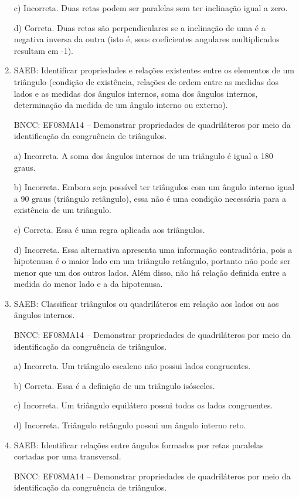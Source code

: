 \begin{enumerate}
c) Incorreta. Duas retas podem ser paralelas sem ter inclinação
igual a zero.

d) Correta. Duas retas são perpendiculares se a inclinação de uma é a
negativa inversa da outra (isto é, seus coeficientes angulares
multiplicados resultam em -1).

\item SAEB: Identificar propriedades e relações existentes entre os elementos
de um triângulo (condição de existência, relações de ordem entre as
medidas dos lados e as medidas dos ângulos internos, soma dos ângulos
internos, determinação da medida de um ângulo interno ou externo).

BNCC: EF08MA14 -- Demonstrar propriedades de quadriláteros por meio da
identificação da congruência de triângulos.

a) Incorreta. A soma dos ângulos internos de um triângulo é igual a
180 graus.

b) Incorreta. Embora seja possível ter triângulos com um ângulo
interno igual a 90 graus (triângulo retângulo), essa não é uma condição
necessária para a existência de um triângulo.

c) Correta. Essa é uma regra aplicada aos triângulos.

d) Incorreta. Essa alternativa apresenta uma informação
contraditória, pois a hipotenusa é o maior lado em um triângulo
retângulo, portanto não pode ser menor que um dos outros lados. Além
disso, não há relação definida entre a medida do menor lado e a da
hipotenusa.

\item SAEB: Classificar triângulos ou quadriláteros em relação aos lados ou
aos ângulos internos.

BNCC: EF08MA14 -- Demonstrar propriedades de quadriláteros por meio da
identificação da congruência de triângulos.

a) Incorreta. Um triângulo escaleno não possui lados congruentes.

b) Correta. Essa é a definição de um triângulo isósceles.

c) Incorreta. Um triângulo equilátero possui todos os lados
congruentes.

d) Incorreta. Triângulo retângulo possui um ângulo interno reto.

\item SAEB: Identificar relações entre ângulos formados por retas paralelas
cortadas por uma transversal.

BNCC: EF08MA14 -- Demonstrar propriedades de quadriláteros por meio da
identificação da congruência de triângulos.


\end{enumerate}
